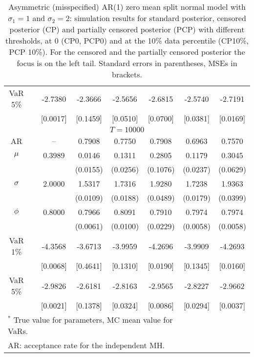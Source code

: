 {\begin{table}
\begin{tabular}{cc cccccc}
VaR 5\% && -2.7380 & -2.3666 & -2.5656 & -2.6815 & -2.5740 & -2.7191 \\ 
 && [0.0017] & [0.1459] & [0.0510] & [0.0700] & [0.0381] & [0.0169] \\ 
\hline 
\multicolumn{8}{c}{$T =10000$}  \\ 
\hline 
AR && -- & 0.7908 & 0.7750 & 0.7908 & 0.6963 & 0.7570 \\  
$\mu$&& 0.3989 & 0.0146 & 0.1311 & 0.2805 & 0.1179 & 0.3045 \\ 
&&   & (0.0155) & (0.0256) & (0.1076) & (0.0237) & (0.0629) \\ 
$\sigma$&& 2.0000 & 1.5317 & 1.7316 & 1.9280 & 1.7238 & 1.9363 \\ 
&&   & (0.0109) & (0.0188) & (0.0489) & (0.0179) & (0.0399) \\ 
$\phi$&& 0.8000 & 0.7966 & 0.8091 & 0.7910 & 0.7974 & 0.7974 \\ 
&&   & (0.0061) & (0.0100) & (0.0229) & (0.0058) & (0.0058) \\ 
VaR 1\% && -4.3568 & -3.6713 & -3.9959 & -4.2696 & -3.9909 & -4.2693 \\ 
  && [0.0068] & [0.4641] & [0.1310] & [0.0190] & [0.1345] & [0.0160] \\ 
VaR 5\% && -2.9826 & -2.6181 & -2.8163 & -2.9565 & -2.8227 & -2.9662 \\ 
 && [0.0021] & [0.1378] & [0.0324] & [0.0086] & [0.0294] & [0.0037] \\ 
\hline 
\multicolumn{6}{l}{\footnotesize{$^*$ True value for parameters, MC mean value for VaRs.}}  \\ 
\multicolumn{6}{l}{\footnotesize{AR: acceptance rate for the independent MH.}}  \\ 
\end{tabular}
 \caption{Asymmetric (misspecified) AR(1) zero mean split normal model with $\sigma_{1}=1$ and $\sigma_{2}=2$: simulation results for standard posterior, censored posterior (CP) and partially censored posterior (PCP)  with different thresholds, at $0$ (CP0, PCP0) and at the 10\% data percentile (CP10\%, PCP 10\%). For the censored and the partially censored posterior the focus is on the left tail. Standard errors in parentheses, MSEs in brackets.} 
\label{tab:ar1_pcp}  
\end{table}
}